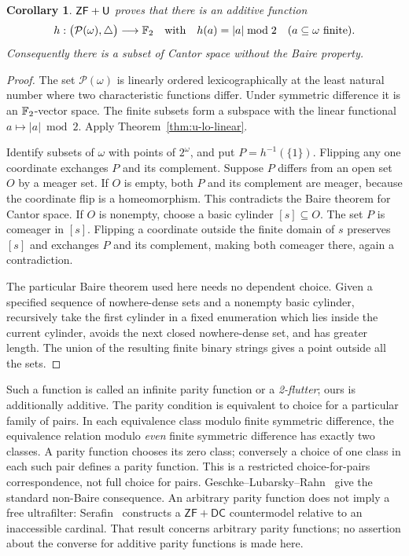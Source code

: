 \documentclass[11pt,a4paper]{article}
\newtheorem{corollary}[theorem]{Corollary}
\theoremstyle{definition}\newtheorem{definition}[theorem]{Definition}
\theoremstyle{remark}\newtheorem{remark}[theorem]{Remark}
\newcommand{\ZF}{\mathsf{ZF}}\newcommand{\ZFA}{\mathsf{ZFA}}
\begin{document}
\begin{corollary}\label{cor:u-parity}
$\ZF+\U$ proves that there is an additive function
\[
 h:\bigl(\mathcal P(\omega),\mathbin\triangle\bigr)\longrightarrow\mathbb F_2
 \quad\text{with}\quad h(a)=|a|\bmod2
 \quad(a\subseteq\omega\text{ finite}).
\]
Consequently there is a subset of Cantor space without the Baire property.
\end{corollary}
\begin{proof}
The set $\mathcal P(\omega)$ is linearly ordered lexicographically at the
least natural number where two characteristic functions differ.
Under symmetric difference it is an $\mathbb F_2$-vector space.  The finite
subsets form a subspace with the linear functional $a\mapsto|a|\bmod2$.
Apply Theorem~\ref{thm:u-lo-linear}.

Identify subsets of $\omega$ with points of $2^\omega$, and put
$P=h^{-1}(\{1\})$.  Flipping any one coordinate exchanges $P$ and its
complement.  Suppose $P$ differs from an open set $O$ by a meager set.
If $O$ is empty, both $P$ and its complement are meager, because the
coordinate flip is a homeomorphism.  This contradicts the Baire theorem
for Cantor space.  If $O$ is nonempty, choose a basic cylinder $[s]\subseteq O$.
The set $P$ is comeager in $[s]$.  Flipping a coordinate outside the finite
domain of $s$ preserves $[s]$ and exchanges $P$ and its complement, making
both comeager there, again a contradiction.

The particular Baire theorem used here needs no dependent choice.
Given a specified sequence of nowhere-dense sets and a nonempty basic
cylinder, recursively take the first cylinder in a fixed enumeration
which lies inside the current cylinder, avoids the next closed
nowhere-dense set, and has greater length.  The union of the resulting
finite binary strings gives a point outside all the sets.
\end{proof}

Such a function is called an infinite parity function or a
\emph{2-flutter}; ours is additionally additive.
The parity condition is equivalent to choice for a particular family of
pairs.  In each equivalence class modulo finite symmetric difference,
the equivalence relation modulo \emph{even} finite symmetric difference
has exactly two classes.  A parity function chooses its zero class;
conversely a choice of one class in each such pair defines a parity
function.  This is a restricted choice-for-pairs correspondence, not full
choice for pairs.
Geschke--Lubarsky--Rahn~\cite[Theorem~10]{GLR} give the standard
non-Baire consequence.  An arbitrary parity function does not imply a
free ultrafilter: Serafin~\cite[Theorem~8]{Serafin} constructs a
$\ZF+\mathsf{DC}$ countermodel relative to an inaccessible cardinal.
That result concerns arbitrary parity functions; no assertion about the
converse for additive parity functions is made here.
\end{document}

